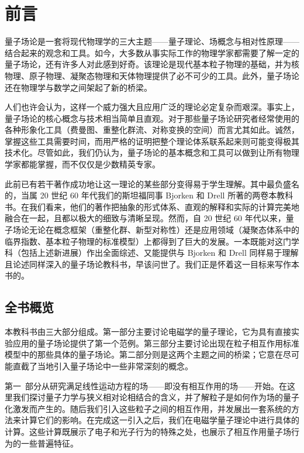\chapter*{前言}

量子场论是一套将现代物理学的三大主题——量子理论、场概念与相对性原理——结合起来的观念和工具。如今，大多数从事实际工作的物理学家都需要了解一定的量子场论，还有许多人对此感到好奇。该理论是现代基本粒子物理的基础，并为核物理、原子物理、凝聚态物理和天体物理提供了必不可少的工具。此外，量子场论还在物理学与数学之间架起了新的桥梁。

人们也许会认为，这样一个威力强大且应用广泛的理论必定复杂而艰深。事实上，量子场论的核心概念与技术相当简单且直观。对于那些量子场论研究者经常使用的各种形象化工具（费曼图、重整化群流、对称变换的空间）而言尤其如此。诚然，掌握这些工具需要时间，而用严格的证明把整个理论体系联系起来则可能变得极其技术化。尽管如此，我们仍认为，量子场论的基本概念和工具可以做到让所有物理学家都能掌握，而不仅仅是少数精英专家。

此前已有若干著作成功地让这一理论的某些部分变得易于学生理解。其中最负盛名的，当属 20 世纪 60 年代我们的斯坦福同事 Bjorken 和 Drell 所著的两卷本教科书。在我们看来，他们的著作把抽象的形式体系、直观的解释和实际的计算完美地融合在一起，且都以极大的细致与清晰呈现。然而，自 20 世纪 60 年代以来，量子场论无论在概念框架（重整化群、新型对称性）还是应用领域（凝聚态体系中的临界指数、基本粒子物理的标准模型）上都得到了巨大的发展。一本既能对这门学科（包括上述新进展）作出全面综述、又能提供与 Bjorken 和 Drell 同样易于理解且论述同样深入的量子场论教科书，早该问世了。我们正是怀着这一目标来写作本书的。

\section*{全书概览}

本教科书由三大部分组成。第一部分主要讨论电磁学的量子理论，它为具有直接实验应用的量子场论提供了第一个范例。第三部分主要讨论出现在粒子相互作用标准模型中的那些具体的量子场论。第二部分则是这两个主题之间的桥梁；它意在尽可能直截了当地引入量子场论中一些非常深刻的概念。

第一~部分从研究满足线性运动方程的场——即没有相互作用的场——开始。在这里我们探讨量子力学与狭义相对论相结合的含义，并了解粒子是如何作为场的量子化激发而产生的。随后我们引入这些粒子之间的相互作用，并发展出一套系统的方法来计算它们的影响。在完成这一引入之后，我们在电磁学量子理论中进行具体的计算。这些计算既展示了电子和光子行为的特殊之处，也展示了相互作用量子场行为的一些普遍特征。

